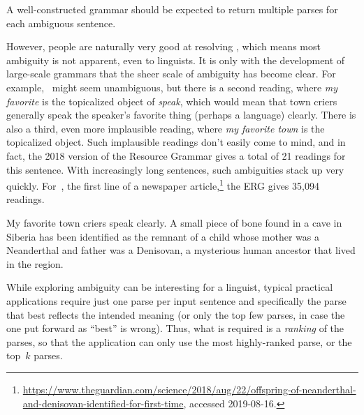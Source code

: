 \documentclass[output=paper,biblatex,babelshorthands,newtxmath,draftmode,colorlinks,citecolor=brown]{langscibook}
\begin{document}
\noindent
A well-constructed grammar should be expected to return multiple
parses for each ambiguous sentence.

\largerpage
However, people are naturally very good at resolving ,
which means most ambiguity is not apparent, even to linguists.
It is only with the development of large-scale grammars that the sheer scale of ambiguity has become clear.
For example, ~might seem unambiguous,
but there is a second reading, where \textit{my favorite} is the topicalized object of \textit{speak},
which would mean that town criers generally speak the speaker's favorite thing (perhaps a language) clearly.
There is also a third, even more implausible reading, where \textit{my favorite town} is the topicalized object.
Such implausible readings don't easily come to mind,
and in fact, the 2018 version of the  Resource Grammar \citep[ERG;][]{Flickinger2000a,Flickinger2011a-u}
gives a total of 21 readings for this sentence.
With increasingly long sentences, such ambiguities stack up very quickly.
For~, the first line of a newspaper article,\footnote{%
	\url{https://www.theguardian.com/science/2018/aug/22/offspring-of-neanderthal-and-denisovan-identified-for-first-time}, accessed 2019-08-16.}
the ERG gives 35,094 readings.

\begin{exe}
\ex\label{cl:ex:ambig-simple}
My favorite town criers speak clearly.
\ex\label{cl:ex:ambig-many}
A small piece of bone found in a cave in Siberia has been identified
as the remnant of a child whose mother was a Neanderthal and father was a Denisovan,
a mysterious human ancestor that lived in the region.
\end{exe}

While exploring ambiguity can be interesting for a linguist,
typical practical applications require just one parse per input sentence
and specifically the parse that best reflects the intended meaning
(or only the top few parses, in case the one put forward as ``best'' is wrong).
Thus, what is required is a \textit{ranking} of the parses,
so that the application can only use the most highly-ranked parse,
or the top~$k$ parses.
\end{document}
